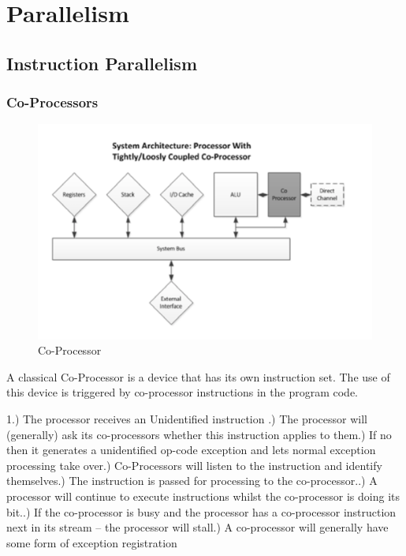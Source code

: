 \newpage
\section{Parallelism}
\subsection{Instruction Parallelism}

\subsubsection{Co-Processors}

\begin{figure}[h!]
\centering
\includegraphics[width=13cm]{pic/co_processor}
\caption{Co-Processor}
\end{figure}
A classical Co-Processor is a device that has its own instruction set. The use of this device is triggered by co-processor instructions in the program code.\newline


1.) The processor receives an Unidentified instruction .) The processor will (generally) ask its co-processors whether this instruction applies to them.) If no then it generates a unidentified op-code exception and lets normal exception processing take over.) Co-Processors will listen to the instruction and identify themselves.) The instruction is passed for processing to the co-processor..) A processor will continue to execute instructions whilst the co-processor is doing its bit..) If the co-processor is busy and the processor has a co-processor instruction next in its stream – the processor will stall.) A co-processor will generally have some form of exception registration\newline


